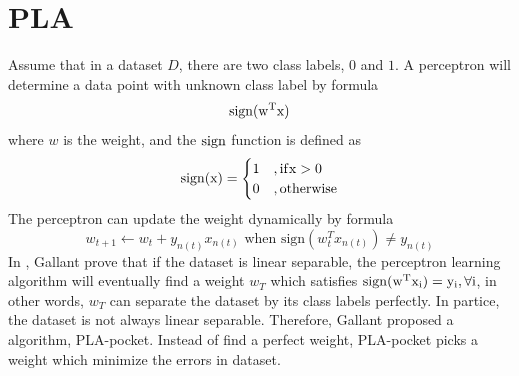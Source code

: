 \documentclass[twocolumn,10pt]{article}
\begin{document}
\section{PLA}
  Assume that in a dataset $D$, there are two class labels, $0$ and $1$. A perceptron will determine a data point with unknown 
  class label by formula 
  \begin{equation}
    \rm{sign}(w^Tx)
  \end{equation}
  where $w$ is the weight, and the $\rm{sign}$ function is defined as 
  \begin{equation}
    \rm{sign}(x)=\begin{cases}1&,\rm{if }x>0\\0&,\rm{otherwise}\end{cases}
  \end{equation}
  The perceptron can update the weight dynamically by formula 
  \begin{equation}
    w_{t+1}\leftarrow w_t+y_{n(t)}x_{n(t)} \text{ when sign}(w^T_tx_{n(t)})\neq y_{n(t)}
  \end{equation}
  In \cite{gallant1990perceptron}, Gallant prove that if the dataset is linear separable, the perceptron learning algorithm will 
  eventually find a weight $w_T$ which satisfies $\rm{sign}(w^Tx_i)=y_i,\forall i$, in other words, $w_T$ can separate the dataset 
  by its class labels perfectly.
  In partice, the dataset is not always linear separable. Therefore, Gallant proposed a algorithm, PLA-pocket. Instead of find a 
  perfect weight, PLA-pocket picks a weight which minimize the errors in dataset. 
\end{document}
